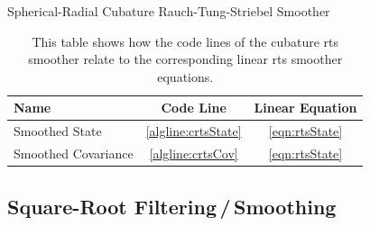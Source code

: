 		\begin{algorithm}  \DontPrintSemicolon
			\caption{Spherical-Radial Cubature Rauch-Tung-Striebel Smoother}
			\label{alg:cubatureRtsSmoother}
		\end{algorithm}
		\begin{table}
			\centering
			\begin{tabular}{l|c|c}
				\textbf{Name}       &   \textbf{Code Line}    & \textbf{Linear Equation} \\ \hline
				Smoothed State      & \ref{algline:crtsState} &   \eqref{eqn:rtsState}   \\
				Smoothed Covariance &  \ref{algline:crtsCov}  &   \eqref{eqn:rtsState}
			\end{tabular}
			\caption{This table shows how the code lines of the cubature \ac{rts} smoother relate to the corresponding linear \ac{rts} smoother equations.}
			\label{tab:cubatureRtsSmoother}
		\end{table}

	\subsection{Square-Root Filtering\,/\,Smoothing}
		\label{subsec:sqrtSmoothing}

